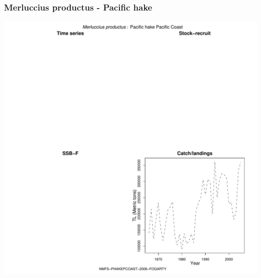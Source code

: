 \subsubsection{Merluccius productus - Pacific hake}
\begin{center}
\includegraphics[width=1.2\textwidth]{../R/figures/NMFS-PHAKEPCOAST-2006-FOGARTY.pdf}
\end{center}

